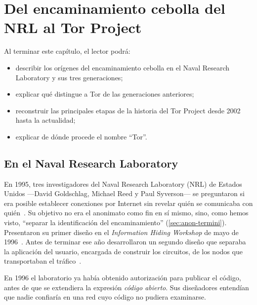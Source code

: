 \chapter{Del encaminamiento cebolla del NRL al Tor Project}\label{cap:03-nascita-tor}

\begin{obiettivi}
Al terminar este capítulo, el lector podrá:
\begin{itemize}[nosep]
  \item describir los orígenes del encaminamiento cebolla en el Naval Research Laboratory y sus tres generaciones;
  \item explicar qué distingue a Tor de las generaciones anteriores;
  \item reconstruir las principales etapas de la historia del Tor Project desde 2002 hasta la actualidad;
  \item explicar de dónde procede el nombre \enquote{Tor}.
\end{itemize}
\end{obiettivi}

\section{En el Naval Research Laboratory}\label{sec:nascita-nrl}

En 1995, tres investigadores del Naval Research Laboratory (NRL) de Estados Unidos ---David Goldschlag, Michael Reed y Paul Syverson--- se preguntaron si era posible establecer conexiones por Internet sin revelar quién se comunicaba con quién~\cite{torhistory}. Su objetivo no era el anonimato como fin en sí mismo, sino, como hemos visto, \enquote{separar la identificación del encaminamiento} (\cref{sec:anon-termini}). Presentaron su primer diseño en el \emph{Information Hiding Workshop} de mayo de 1996~\cite{goldschlag1996hiding}. Antes de terminar ese año desarrollaron un segundo diseño que separaba la aplicación del usuario, encargada de construir los circuitos, de los nodos que transportaban el tráfico~\cite{syverson2011peel}.

En 1996 el laboratorio ya había obtenido autorización para publicar el código, antes de que se extendiera la expresión \emph{código abierto}. Sus diseñadores entendían que nadie confiaría en una red cuyo código no pudiera examinarse.

